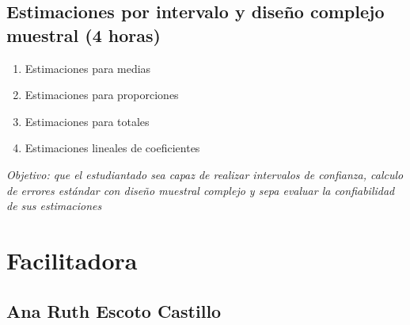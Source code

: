 \documentclass[
  letterpaper,
  DIV=11,
  numbers=noendperiod]{scrreprt}
\begin{document}
\hypertarget{estimaciones-por-intervalo-y-diseuxf1o-complejo-muestral-4-horas}{%
\section*{Estimaciones por intervalo y diseño complejo muestral (4
horas)}\label{estimaciones-por-intervalo-y-diseuxf1o-complejo-muestral-4-horas}}


\begin{enumerate}
\def\labelenumi{\alph{enumi}.}
\item
  Estimaciones para medias
\item
  Estimaciones para proporciones
\item
  Estimaciones para totales
\item
  Estimaciones lineales de coeficientes
\end{enumerate}

\emph{Objetivo: que el estudiantado sea capaz de realizar intervalos de
confianza, calculo de errores estándar con diseño muestral complejo y
sepa evaluar la confiabilidad de sus estimaciones}


\hypertarget{facilitadora}{%
\chapter*{Facilitadora}\label{facilitadora}}


\hypertarget{ana-ruth-escoto-castillo}{%
\section*{Ana Ruth Escoto Castillo}\label{ana-ruth-escoto-castillo}}

\end{document}
